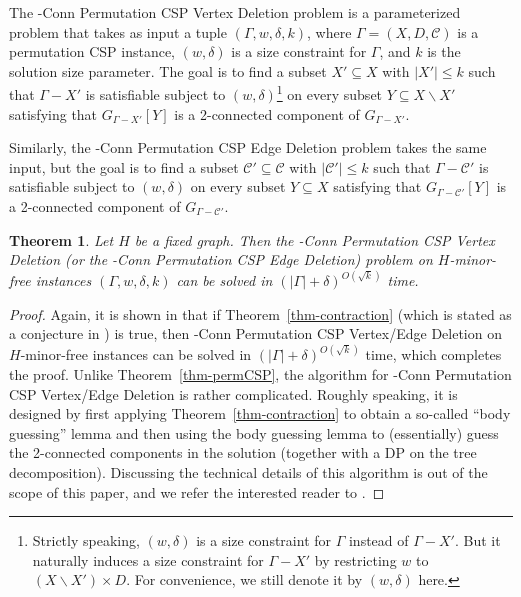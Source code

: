 \documentclass[a4paper,11pt]{article}
\numberwithin{lemma}{section}
\newtheorem{theorem}[lemma]{Theorem}
\begin{document}
The {-Conn Permutation CSP Vertex Deletion} problem is a parameterized problem that takes as input a tuple $(\varGamma,w,\delta,k)$, where $\varGamma = (X,D,\mathcal{C})$ is a permutation CSP instance, $(w,\delta)$ is a size constraint for $\varGamma$, and $k$ is the solution size parameter.
The goal is to find a subset $X' \subseteq X$ with $|X'| \leq k$ such that $\varGamma - X'$ is satisfiable subject to $(w,\delta)$\footnote{Strictly speaking, $(w,\delta)$ is a size constraint for $\varGamma$ instead of $\varGamma - X'$. But it naturally induces a size constraint for $\varGamma - X'$ by restricting $w$ to $(X \backslash X') \times D$. For convenience, we still denote it by $(w,\delta)$ here.} on every subset $Y \subseteq X \backslash X'$ satisfying that $G_{\varGamma - X'}[Y]$ is a 2-connected component of $G_{\varGamma - X'}$.

Similarly, the {-Conn Permutation CSP Edge Deletion} problem takes the same input, but the goal is to find a subset $\mathcal{C}' \subseteq \mathcal{C}$ with $|\mathcal{C}'| \leq k$ such that $\varGamma - \mathcal{C}'$ is satisfiable subject to $(w,\delta)$ on every subset $Y \subseteq X$ satisfying that $G_{\varGamma - \mathcal{C}'}[Y]$ is a 2-connected component of $G_{\varGamma - \mathcal{C}'}$.

\begin{theorem}\label{thm-2conn}
 Let $H$ be a fixed graph.
 Then the {-Conn Permutation CSP Vertex Deletion} (or the {-Conn Permutation CSP Edge Deletion}) problem on $H$-minor-free instances $(\varGamma,w,\delta,k)$ can be solved in $(|\varGamma|+\delta)^{O(\sqrt{k})}$ time.
\end{theorem}

\begin{proof}
 Again, it is shown in \cite{MarxMNT22} that if Theorem~\ref{thm-contraction} (which is stated as a conjecture in \cite{MarxMNT22}) is true, then {-Conn Permutation CSP Vertex/Edge Deletion} on $H$-minor-free instances can be solved in $(|\varGamma|+\delta)^{O(\sqrt{k})}$ time, which completes the proof.
 Unlike Theorem~\ref{thm-permCSP}, the algorithm for {-Conn Permutation CSP Vertex/Edge Deletion} is rather complicated.
 Roughly speaking, it is designed by first applying Theorem~\ref{thm-contraction} to obtain a so-called ``body guessing'' lemma and then using the body guessing lemma to (essentially) guess the 2-connected components in the solution (together with a DP on the tree decomposition).
 Discussing the technical details of this algorithm is out of the scope of this paper, and we refer the interested reader to \cite{MarxMNT22}.
\end{proof}
\end{document}
